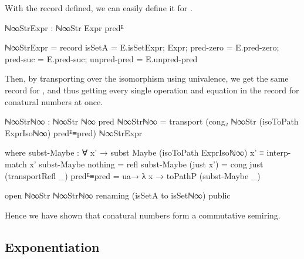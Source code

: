 With the record defined, we can easily define it for .
\begin{code}
ℕ∞StrExpr : ℕ∞Str Expr predᴱ
\end{code}
\begin{code}[hide]
ℕ∞StrExpr =
  record
    { isSetA = E.isSetExpr;
      Expr;
      pred-zero = E.pred-zero;
      pred-suc = E.pred-suc;
      unpred-pred = E.unpred-pred }
\end{code}
Then, by transporting over the isomorphism using univalence, we get the same
record for , and thus getting every single operation and equation
in the record for conatural numbers at once.
\begin{code}
ℕ∞Strℕ∞ : ℕ∞Str ℕ∞ pred
ℕ∞Strℕ∞ =
  transport
    (cong₂ ℕ∞Str (isoToPath ExprIsoℕ∞) predᴱ≡pred)
    ℕ∞StrExpr
\end{code}
\begin{code}[hide]
  where
  subst-Maybe :
    ∀ x' → subst Maybe (isoToPath ExprIsoℕ∞) x' ≡ interp-match x'
  subst-Maybe nothing = refl
  subst-Maybe (just x') = cong just (transportRefl _)
  predᴱ≡pred = ua→ λ x → toPathP (subst-Maybe _)

open ℕ∞Str ℕ∞Strℕ∞ renaming (isSetA to isSetℕ∞) public
\end{code}
Hence we have shown that conatural numbers form a commutative semiring.

\subsection{Exponentiation}

